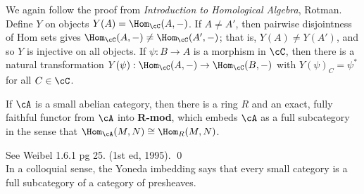 \pf We again follow the proof from \emph{Introduction to Homological Algebra}, Rotman. Define $Y$ on objects $Y(A)=\Hom_\cC(A,-)$. If $A \neq A'$, then pairwise disjointness of Hom sets gives $\Hom_\cC(A,-) \neq \Hom_\cC(A',-)$; that is, $Y(A) \neq Y(A')$, and so $Y$ is injective on all objects. If $\psi: B \to A$ is a morphism in $\cC$, then there is a natural transformation $Y(\psi): \Hom_\cC(A,-) \to \Hom_\cC(B,-)$ with $Y(\psi)_C=\psi^*$ for all $C \in \cC$. 



\begin{prop}
If $\cA$ is a small abelian category, then there is a ring $R$ and an exact, fully faithful functor from $\cA$ into \textbf{R-mod}, which embeds $\cA$ as a full subcategory in the sense that $\Hom_{\cA}(M,N) \cong \Hom_R(M,N)$. 
\end{prop}

\pf See Weibel 1.6.1 pg 25. (1st ed, 1995). \qed \\


In a colloquial sense, the Yoneda imbedding says that every small category is a full subcategory of a category of presheaves. 